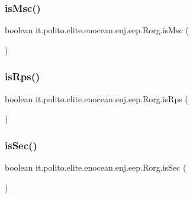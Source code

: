 \subsubsection{\texorpdfstring{is\+Msc()}{isMsc()}}
{\footnotesize\ttfamily boolean it.\+polito.\+elite.\+enocean.\+enj.\+eep.\+Rorg.\+is\+Msc (\begin{DoxyParamCaption}{ }\end{DoxyParamCaption})}

\hypertarget{classit_1_1polito_1_1elite_1_1enocean_1_1enj_1_1eep_1_1_rorg_a0d867eda5033139f161f83be685c9cdc}{}\label{classit_1_1polito_1_1elite_1_1enocean_1_1enj_1_1eep_1_1_rorg_a0d867eda5033139f161f83be685c9cdc} 
\subsubsection{\texorpdfstring{is\+Rps()}{isRps()}}
{\footnotesize\ttfamily boolean it.\+polito.\+elite.\+enocean.\+enj.\+eep.\+Rorg.\+is\+Rps (\begin{DoxyParamCaption}{ }\end{DoxyParamCaption})}

\hypertarget{classit_1_1polito_1_1elite_1_1enocean_1_1enj_1_1eep_1_1_rorg_a1a0185587d349d30151b0366c270644b}{}\label{classit_1_1polito_1_1elite_1_1enocean_1_1enj_1_1eep_1_1_rorg_a1a0185587d349d30151b0366c270644b} 
\subsubsection{\texorpdfstring{is\+Sec()}{isSec()}}
{\footnotesize\ttfamily boolean it.\+polito.\+elite.\+enocean.\+enj.\+eep.\+Rorg.\+is\+Sec (\begin{DoxyParamCaption}{ }\end{DoxyParamCaption})}

\hypertarget{classit_1_1polito_1_1elite_1_1enocean_1_1enj_1_1eep_1_1_rorg_ae79783a494a443bc6ffcc02a98f84be8}{}\label{classit_1_1polito_1_1elite_1_1enocean_1_1enj_1_1eep_1_1_rorg_ae79783a494a443bc6ffcc02a98f84be8} 
